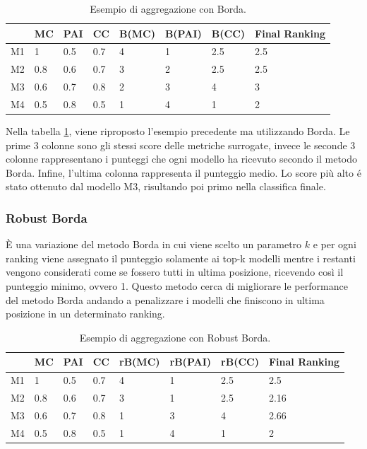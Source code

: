 \begin{table}
	
	\centering
	\begin{tabular}{|l|l|l|l|l|l|l|l|}
		\hline
		   & MC  & PAI & CC  & B(MC) & B(PAI) & B(CC) & Final Ranking \\ \hline
		M1 & 1   & 0.5 & 0.7 & 4     & 1      & 2.5   & 2.5           \\ \hline
		M2 & 0.8 & 0.6 & 0.7 & 3     & 2      & 2.5   & 2.5           \\ \hline
		M3 & 0.6 & 0.7 & 0.8 & 2     & 3      & 4     & 3             \\ \hline
		M4 & 0.5 & 0.8 & 0.5 & 1     & 4      & 1     & 2             \\ \hline
	\end{tabular}
	\caption{\label{borda}Esempio di aggregazione con Borda.}
\end{table}


Nella tabella \ref{borda}, viene riproposto l'esempio precedente ma utilizzando Borda. Le prime 3 colonne sono gli stessi score delle metriche surrogate, invece le seconde 3 colonne rappresentano i punteggi che ogni modello ha ricevuto secondo il metodo Borda. Infine, l'ultima colonna rappresenta il punteggio medio. Lo score più alto é stato ottenuto dal modello M3, risultando poi primo nella classifica finale.
\subsubsection{Robust Borda}
È una variazione del metodo Borda in cui viene scelto un parametro $k$ e per ogni ranking viene assegnato il punteggio solamente ai top-k modelli mentre i restanti vengono considerati come se fossero tutti in ultima posizione, ricevendo così il punteggio minimo, ovvero 1. Questo metodo cerca di migliorare le performance del metodo Borda andando a penalizzare i modelli che finiscono in ultima posizione in un determinato ranking. 

\begin{table}
	
	\centering
	\begin{tabular}{|l|l|l|l|l|l|l|l|}
		\hline
		   & MC  & PAI & CC  & rB(MC) & rB(PAI) & rB(CC) & Final Ranking \\ \hline
		M1 & 1   & 0.5 & 0.7 & 4      & 1       & 2.5    & 2.5           \\ \hline
		M2 & 0.8 & 0.6 & 0.7 & 3      & 1       & 2.5    & 2.16          \\ \hline
		M3 & 0.6 & 0.7 & 0.8 & 1      & 3       & 4      & 2.66          \\ \hline
		M4 & 0.5 & 0.8 & 0.5 & 1      & 4       & 1      & 2             \\ \hline
	\end{tabular}
	\caption{\label{rborda}Esempio di aggregazione con Robust Borda.}
\end{table}

